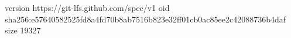 version https://git-lfs.github.com/spec/v1
oid sha256:e57640582525fd8a4fd70b8ab7516b823e32ff01cb0ac85ee2c42088736b4daf
size 19327
